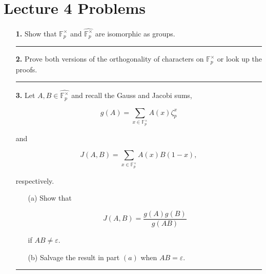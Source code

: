 \documentclass[12pt]{amsart}
\theoremstyle{definition}
\theoremstyle{remark}
\numberwithin{equation}{section}
\def \eps{\varepsilon}
\newcommand{\fp}
{\mathbb{F}_p}
\newcommand{\fphat}
{\widehat{\mathbb{F}_{p}^{\times}}}
\begin{document}
\vspace{8mm}

\section*{Lecture 4 Problems}

\begin{itemize}
    \item[\textbf{1.}] Show that $\fp^{\times}$ and $\fphat$ are isomorphic as groups.

    \vspace{8mm}

    \hrule{}

    \vspace{4mm}

    \item[\textbf{2.}] Prove both versions of the orthogonality of characters on $\fp^{\times}$ or look up the proofs. 

    \vspace{8mm}

    \hrule{}

    \vspace{4mm}


    \item[\textbf{3.}] Let $A,B \in \fphat$ and recall the Gauss and Jacobi sums,

    $$g(A) = \sum_{x \in \fp^{\times}} A(x) \zeta_{p}^{x}$$

    and

    $$J(A,B) = \sum_{x \in \fp^{\times}} A(x)B(1-x),$$

    respectively.

    \vspace{4mm}

    \begin{itemize}
    
    \item[(a)] Show that 

    $$J(A,B) = \frac{g(A)g(B)}{g(AB)}$$

    if $AB \neq \eps$.
    \vspace{4mm}

    \item[(b)] Salvage the result in part $(a)$ when $AB=\eps$.
    \end{itemize}

\vspace{8mm}

\hrule{}

\vspace{4mm}


\end{itemize}
\end{document}

